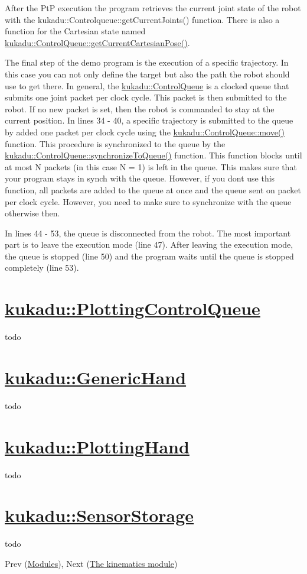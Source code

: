 After the PtP execution the program retrieves the current joint state of the robot with the kukadu\+::\+Controlqueue\+::get\+Current\+Joints() function. There is also a function for the Cartesian state named \hyperlink{classkukadu_1_1ControlQueue_a9e79e1d0d9697bbf146d66a2d01fea9e}{kukadu\+::\+Control\+Queue\+::get\+Current\+Cartesian\+Pose()}.

The final step of the demo program is the execution of a specific trajectory. In this case you can not only define the target but also the path the robot should use to get there. In general, the \hyperlink{classkukadu_1_1ControlQueue}{kukadu\+::\+Control\+Queue} is a clocked queue that submits one joint packet per clock cycle. This packet is then submitted to the robot. If no new packet is set, then the robot is commanded to stay at the current position. In lines 34 -\/ 40, a specific trajectory is submitted to the queue by added one packet per clock cycle using the \hyperlink{classkukadu_1_1ControlQueue_aca70a978b2950d7c9ab99d55c5977eec}{kukadu\+::\+Control\+Queue\+::move()} function. This procedure is synchronized to the queue by the \hyperlink{classkukadu_1_1ControlQueue_a324484e79a5505656a32d9f32054e5d0}{kukadu\+::\+Control\+Queue\+::synchronize\+To\+Queue()} function. This function blocks until at most N packets (in this case N = 1) is left in the queue. This makes sure that your program stays in synch with the queue. However, if you dont use this function, all packets are added to the queue at once and the queue sent on packet per clock cycle. However, you need to make sure to synchronize with the queue otherwise then.

In lines 44 -\/ 53, the queue is disconnected from the robot. The most important part is to leave the execution mode (line 47). After leaving the execution mode, the queue is stopped (line 50) and the program waits until the queue is stopped completely (line 53).

\section*{\hyperlink{classkukadu_1_1PlottingControlQueue}{kukadu\+::\+Plotting\+Control\+Queue}}

todo

\section*{\hyperlink{classkukadu_1_1GenericHand}{kukadu\+::\+Generic\+Hand}}

todo

\section*{\hyperlink{classkukadu_1_1PlottingHand}{kukadu\+::\+Plotting\+Hand}}

todo

\section*{\hyperlink{classkukadu_1_1SensorStorage}{kukadu\+::\+Sensor\+Storage}}

todo

Prev (\hyperlink{modulespage}{Modules}), Next (\hyperlink{kinematicspage}{The kinematics module}) 